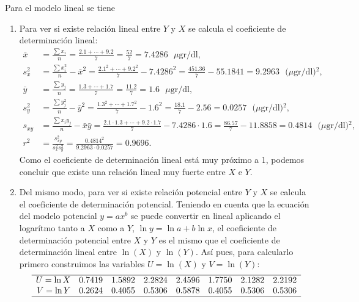 {Para el modelo lineal se tiene
\begin{enumerate}
\item Para ver si existe relación lineal entre $Y$ y $X$ se calcula el coeficiente de determinación lineal:
\begin{align*}
\bar x &= \frac{\sum x_i}{n} = \frac{2.1+\cdots+9.2}{7} = \frac{52}{7} = 7.4286 \text{ $\mu$gr/dl},\\
s_x^2 &= \frac{\sum x_i^2}{n}-\bar x^2 = \frac{2.1^2+\cdots+9.2^2}{7} -7.4286^2= \frac{451.36}{7}-55.1841 = 9.2963 \text{ $(\mu$gr/dl)$^2$},\\
\bar y &= \frac{\sum y_j}{n} = \frac{1.3+\cdots+1.7}{7} = \frac{11.2}{7} = 1.6 \text{ $\mu$gr/dl},\\
s_y^2 &= \frac{\sum y_j^2}{n}-\bar y^2 = \frac{1.3^2+\cdots+1.7^2}{7} -1.6^2= \frac{18.1}{7}-2.56 = 0.0257 \text{ $(\mu$gr/dl)$^2$},\\
s_{xy} &= \frac{\sum x_iy_j}{n}-\bar x\bar y = \frac{2.1\cdot1.3+\cdots+9.2\cdot1.7}{7}-7.4286\cdot1.6 = \frac{86.57}{7}-11.8858 = 0.4814 \text{ $(\mu$gr/dl)$^2$},\\
r^2 &= \frac{s_{xy}^2}{s_x^2 s_y^2} = \frac{0.4814^2}{9.2963\cdot 0.0257} = 0.9696.
\end{align*}
Como el coeficiente de determinación lineal está muy próximo a 1, podemos concluir que existe una relación lineal muy fuerte entre $X$ e $Y$.

\item Del mismo modo, para ver si existe relación potencial entre $Y$ y $X$ se calcula el coeficiente de determinación potencial.
Teniendo en cuenta que la ecuación del modelo potencial $y=ax^b$ se puede convertir en lineal aplicando el logarítmo tanto a $X$ como a $Y$,
$\ln y = \ln a + b\ln x$, el coeficiente de determinación potencial entre $X$ y $Y$ es el mismo que el coeficiente de determinación lineal entre $\ln(X)$ y $\ln(Y)$.
Así pues, para calcularlo primero construimos las variables $U=\ln(X)$ y $V=\ln(Y)$:
\[
\begin{array}{rrrrrrrr}
   \hline
U = \ln X & 0.7419 & 1.5892 & 2.2824 & 2.4596 & 1.7750 & 2.1282 & 2.2192 \\
  V = \ln Y & 0.2624 & 0.4055 & 0.5306 & 0.5878 & 0.4055 & 0.5306 & 0.5306 \\
   \hline
\end{array}\]


\end{enumerate}}

